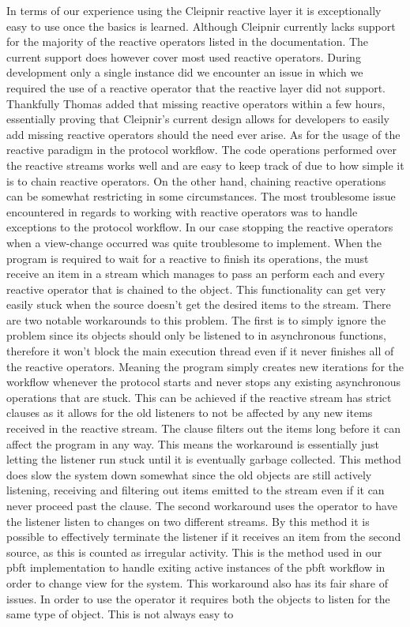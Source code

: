 \iffalse
In terms of our experience using the Cleipnir reactive layer it is exceptionally easy to use once the basics is learned. Although Cleipnir currently lacks support for the majority of the reactive operators listed in the documentation. The current support does however cover most used reactive operators. During development only a single instance did we encounter an issue in which we required the use of a reactive operator that the reactive layer did not support. Thankfully Thomas added that missing reactive operators within a few hours, essentially proving that Cleipnir's current design allows for developers to easily add missing reactive operators should the need ever arise. As for the usage of the reactive paradigm in the protocol workflow. The code operations performed over the reactive streams works well and are easy to keep track of due to how simple it is to chain reactive operators. On the other hand, chaining reactive operations can be somewhat restricting in some circumstances. The most troublesome issue encountered in regards to working with reactive operators was to handle exceptions to the protocol workflow. In our case stopping the reactive operators when a view-change occurred was quite troublesome to implement. When the program is required to wait for a reactive  to finish its operations, the  must receive an item in a stream which manages to pass an perform each and every reactive operator that is chained to the  object. This functionality can get very easily stuck when the source doesn't get the desired items to the stream. There are two notable workarounds to this problem. The first is to simply ignore the problem since its  objects should only be listened to in  asynchronous functions, therefore it won't block the main execution thread even if it never finishes all of the reactive operators. Meaning the program simply creates new iterations for the workflow whenever the protocol starts and never stops any existing asynchronous operations that are stuck. This can be achieved if the reactive stream has strict  clauses as it allows for the old listeners to not be affected by any new items received in the reactive stream. The  clause filters out the items long before it can affect the program in any way. This means the workaround is essentially just letting the listener run stuck until it is eventually garbage collected. This method does slow the system down somewhat since the old  objects are still actively listening, receiving and filtering out items emitted to the stream even if it can never proceed past the  clause. The second workaround uses the  operator to have the listener listen to changes on two different streams. By this method it is possible to effectively terminate the listener if it receives an item from the second source, as this is counted as irregular activity. This is the method used in our \ac{pbft} implementation to handle exiting active instances of the \ac{pbft} workflow in order to change view for the system. This workaround also has its fair share of issues. In order to use the  operator it requires both the  objects to listen for the same type of object. This is not always easy to 